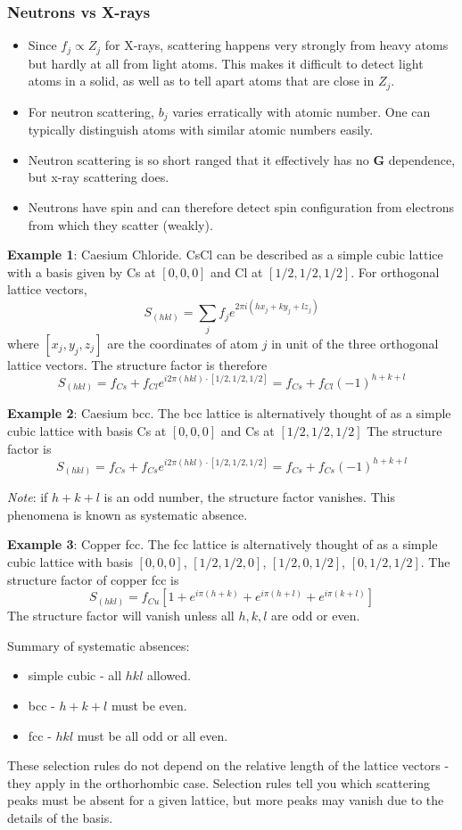 \documentclass[10pt]{article}
\begin{document}
\subsubsection{Neutrons vs X-rays}
\begin{itemize}
  \item Since $f_{j} \propto Z_{j}$ for X-rays, scattering happens very strongly from heavy atoms but hardly at all from light atoms. This makes
  it difficult to detect light atoms in a solid, as well as to tell apart atoms that are close in $Z_{j}$.
  \item For neutron scattering, $b_{j}$ varies erratically with atomic number. One can typically distinguish atoms with similar atomic numbers easily.
  \item Neutron scattering is so short ranged that it effectively has no $\textbf{G}$ dependence, but x-ray scattering does.
  \item Neutrons have spin and can therefore detect spin configuration from electrons from which they scatter (weakly).
\end{itemize}


\textbf{Example 1}: Caesium Chloride. CsCl can be described as a simple cubic lattice with a basis given by Cs at $[0,0,0]$ and Cl at $[1/2,1/2,1/2]$.
For orthogonal lattice vectors,
$$S_{(hkl)} = \sum_{j} f_{j}e^{2\pi i(hx_{j} + ky_{j} + lz_{j})}$$
where $[x_{j}, y_{j}, z_{j}]$ are the coordinates of atom $j$ in unit of the three orthogonal lattice vectors.
The structure factor is therefore
$$S_{(hkl)} = f_{Cs} + f_{Cl}e^{i2\pi (hkl)\cdot [1/2,1/2,1/2]} = f_{Cs} + f_{Cl}(-1)^{h+k+l}$$

\textbf{Example 2}: Caesium bcc. The bcc lattice is alternatively thought of as a simple cubic lattice with basis Cs at $[0,0,0]$ and Cs at $[1/2,1/2,1/2]$
The structure factor is
$$S_{(hkl)} = f_{Cs} + f_{Cs}e^{i2\pi (hkl)\cdot [1/2,1/2,1/2]} = f_{Cs} + f_{Cs}(-1)^{h+k+l}$$

\emph{Note}: if $h+k+l$ is an odd number, the structure factor vanishes. This phenomena is known as systematic absence.

\textbf{Example 3}: Copper fcc. The fcc lattice is alternatively thought of as a simple cubic lattice with basis $[0,0,0]$, $[1/2, 1/2, 0]$, $[1/2, 0, 1/2]$, $[0, 1/2, 1/2]$.
The structure factor of copper fcc is
$$S_{(hkl)} = f_{Cu}[1  + e^{i\pi (h + k)} + e^{i\pi (h + l)} + e^{i\pi (k + l)}] $$
The structure factor will vanish unless all $h,k,l$ are odd or even.

Summary of systematic absences:
\begin{itemize}
  \item simple cubic - all $hkl$ allowed.
  \item bcc - $h+k+l$ must be even.
  \item fcc - $hkl$ must be all odd or all even.
\end{itemize}
These selection rules do not depend on the relative length of the lattice vectors - they apply in the orthorhombic case. Selection rules tell you which scattering peaks
must be absent for a given lattice, but more peaks may vanish due to the details of the basis.
\end{document}
